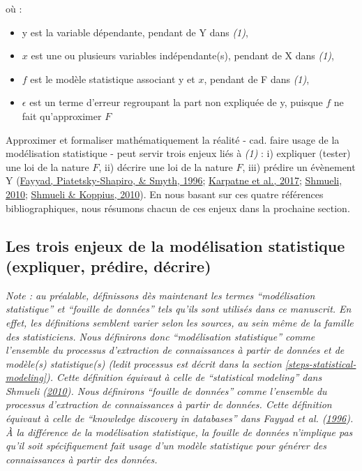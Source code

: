 \documentclass[12pt,twoside]{reedthesis}
\providecommand{\tightlist}{%
  \setlength{\itemsep}{0pt}\setlength{\parskip}{0pt}}
\begin{document}
où :
\begin{itemize}
\tightlist
\item
  y est la variable dépendante, pendant de Y dans \emph{(1)},
\item
  \(x\) est une ou plusieurs variables indépendante(s), pendant de X dans \emph{(1)},
\item
  \(f\) est le modèle statistique associant y et \(x\), pendant de F dans \emph{(1)},
\item
  \(\epsilon\) est un terme d'erreur regroupant la part non expliquée de y, puisque \(f\) ne fait qu'approximer \(F\)
\end{itemize}
\hfill\break

Approximer et formaliser mathématiquement la réalité - cad. faire usage de la modélisation statistique - peut servir trois enjeux liés à \emph{(1)} : i) expliquer (tester) une loi de la nature \(F\), ii) décrire une loi de la nature \(F\), iii) prédire un évènement Y (\protect\hyperlink{ref-fayyad_data_nodate}{Fayyad, Piatetsky-Shapiro, \& Smyth, 1996}; \protect\hyperlink{ref-karpatne_theory-guided_2017}{Karpatne et al., 2017}; \protect\hyperlink{ref-shmueli_explain_2010}{Shmueli, 2010}; \protect\hyperlink{ref-shmueli_predictive_2010}{Shmueli \& Koppius, 2010}). En nous basant sur ces quatre références bibliographiques, nous résumons chacun de ces enjeux dans la prochaine section.\\

\hypertarget{les-trois-enjeux-de-la-moduxe9lisation-statistique-expliquer-pruxe9dire-duxe9crire}{%
\subsection{Les trois enjeux de la modélisation statistique (expliquer, prédire, décrire)}\label{les-trois-enjeux-de-la-moduxe9lisation-statistique-expliquer-pruxe9dire-duxe9crire}}

\emph{Note : au préalable, définissons dès maintenant les termes ``modélisation statistique'' et ``fouille de données'' tels qu'ils sont utilisés dans ce manuscrit. En effet, les définitions semblent varier selon les sources, au sein même de la famille des statisticiens. Nous définirons donc ``modélisation statistique'' comme l'ensemble du processus d'extraction de connaissances à partir de données et de modèle(s) statistique(s) (ledit processus est décrit dans la section \ref{steps-statistical-modeling}). Cette définition équivaut à celle de ``statistical modeling'' dans Shmueli (\protect\hyperlink{ref-shmueli_explain_2010}{2010}). Nous définirons ``fouille de données'' comme l'ensemble du processus d'extraction de connaissances à partir de données. Cette définition équivaut à celle de ``knowledge discovery in databases'' dans Fayyad et al. (\protect\hyperlink{ref-fayyad_data_nodate}{1996}). À la différence de la modélisation statistique, la fouille de données n'implique pas qu'il soit spécifiquement fait usage d'un modèle statistique pour générer des connaissances à partir des données.}
\end{document}
